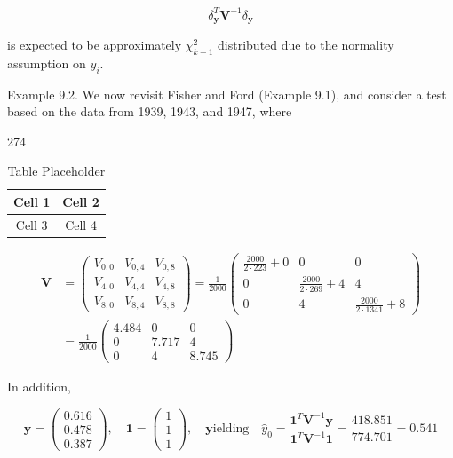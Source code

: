 \documentclass{article}
\begin{document}
\begin{equation}
\delta_{\mathbf{y}}^{T}\mathbf{V}^{-1}\delta_{\mathbf{y}}
\tag{9.6c}
\label{eq:9_6c}
\end{equation}

is expected to be approximately  $ \chi_{k-1}^{2} $ distributed due to the normality assumption on  $ y_{i} $.

Example 9.2. We now revisit Fisher and Ford (Example 9.1), and consider a test based on the data from 1939, 1943, and 1947, where

274

\begin{table}[h]
\centering
\begin{tabular}{|c|c|}
\hline
Cell 1 & Cell 2 \\
\hline
Cell 3 & Cell 4 \\
\hline
\end{tabular}
\caption{Table Placeholder}
\end{table}

\begin{equation}
\begin{aligned}\mathbf{V}&=\begin{pmatrix}{{{V_{0,0}}}}&{{{V_{0,4}}}}&{{{V_{0,8}}}} \\{{{V_{4,0}}}}&{{{V_{4,4}}}}&{{{V_{4,8}}}} \\{{{V_{8,0}}}}&{{{V_{8,4}}}}&{{{V_{8,8}}}}\end{pmatrix}=\frac{1}{2000}\begin{pmatrix}{{{\frac{2000}{2\cdot223}+0}}}&{{{0}}}&{{{0}}} \\{{{0}}}&{{{\frac{2000}{2\cdot269}+4}}}&{{{4}}} \\{{{0}}}&{{{4}}}&{{{\frac{2000}{2\cdot1341}+8}}}\end{pmatrix}\\ &=\frac{1}{2000}\begin{pmatrix}{{{4.484}}}&{{{0}}}&{{{0}}} \\{{{0}}}&{{{7.717}}}&{{{4}}} \\{{{0}}}&{{{4}}}&{{{8.745}}}\end{pmatrix}\end{aligned}
\end{equation}

In addition,

\begin{equation}
\mathbf{y}=\begin{pmatrix}0.616\\ 0.478\\ 0.387\end{pmatrix},\quad\mathbf{1}=\begin{pmatrix}1\\ 1\\ 1\end{pmatrix},\quad\mathbf{y}\text{ielding}\quad\widehat{y}_{0}=\frac{\mathbf{1}^{T}\mathbf{V}^{-1}\mathbf{y}}{\mathbf{1}^{T}\mathbf{V}^{-1}\mathbf{1}}=\frac{418.851}{774.701}=0.541
\end{equation}
\end{document}
